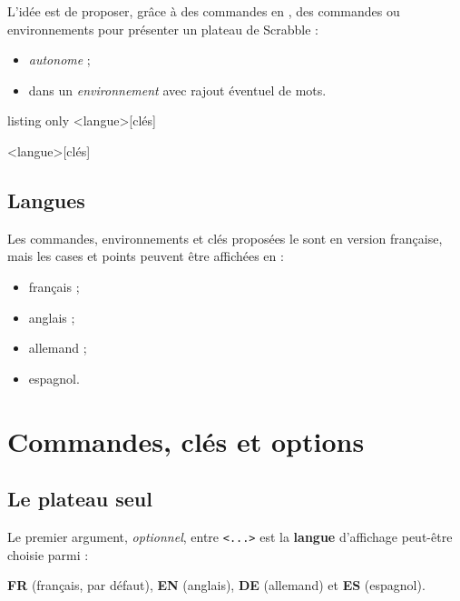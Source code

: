 \documentclass{article}
\newcommand\Cle[1]{{\bfseries\sffamily\textlangle #1\textrangle}}
\begin{document}
L'idée est de proposer, grâce à des commandes en \TikZ, des \textsf{commandes} ou \textsf{environnements} pour présenter un plateau de Scrabble\texttrademark{} :

\begin{itemize}
	\item \textit{autonome} ;
	\item dans un \textit{environnement} avec rajout éventuel de mots.
\end{itemize}

\begin{PresentationCode}{listing only}
\PlateauScrabble<langue>[clés]

\begin{EnvScrabble}<langue>[clés]
\end{EnvScrabble}
\end{PresentationCode}

\subsection{Langues}

Les \textsf{commandes}, \textsf{environnements} et \textsf{clés} proposées le sont en version \textsf{française}, mais les cases et points peuvent être affichées en :

\begin{itemize}
	\item français ;
	\item anglais ;
	\item allemand ;
	\item espagnol.
\end{itemize}

\pagebreak

\section{Commandes, clés et options}

\subsection{Le plateau seul}

Le premier argument, \textit{optionnel}, entre \texttt{<...>} est la \Cle{langue} d'affichage peut-être choisie parmi :

\hfill\Cle{FR} (français, par défaut), \Cle{EN} (anglais), \Cle{DE} (allemand) et \Cle{ES} (espagnol).\hfill~
\end{document}
